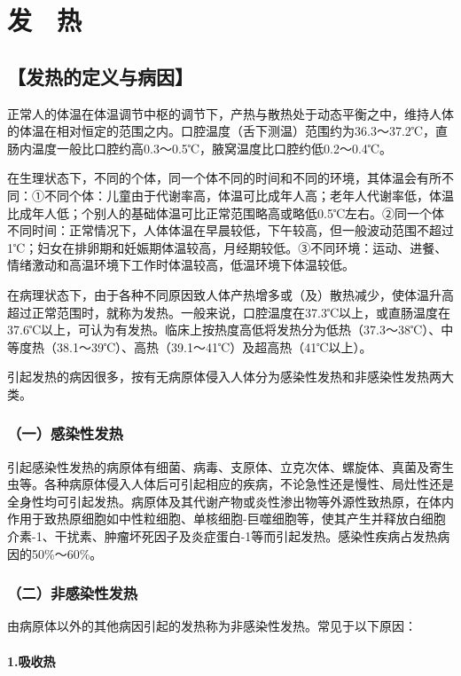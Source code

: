 \chapter{发　热}

\section{【发热的定义与病因】}

正常人的体温在体温调节中枢的调节下，产热与散热处于动态平衡之中，维持人体的体温在相对恒定的范围之内。口腔温度（舌下测温）范围约为36.3～37.2℃，直肠内温度一般比口腔约高0.3～0.5℃，腋窝温度比口腔约低0.2～0.4℃。

在生理状态下，不同的个体，同一个体不同的时间和不同的环境，其体温会有所不同：①不同个体：儿童由于代谢率高，体温可比成年人高；老年人代谢率低，体温比成年人低；个别人的基础体温可比正常范围略高或略低0.5℃左右。②同一个体不同时间：正常情况下，人体体温在早晨较低，下午较高，但一般波动范围不超过1℃；妇女在排卵期和妊娠期体温较高，月经期较低。③不同环境：运动、进餐、情绪激动和高温环境下工作时体温较高，低温环境下体温较低。

在病理状态下，由于各种不同原因致人体产热增多或（及）散热减少，使体温升高超过正常范围时，就称为发热。一般来说，口腔温度在37.3℃以上，或直肠温度在37.6℃以上，可认为有发热。临床上按热度高低将发热分为低热（37.3～38℃）、中等度热（38.1～39℃）、高热（39.1～41℃）及超高热（41℃以上）。

引起发热的病因很多，按有无病原体侵入人体分为感染性发热和非感染性发热两大类。

\subsection{（一）感染性发热}

引起感染性发热的病原体有细菌、病毒、支原体、立克次体、螺旋体、真菌及寄生虫等。各种病原体侵入人体后可引起相应的疾病，不论急性还是慢性、局灶性还是全身性均可引起发热。病原体及其代谢产物或炎性渗出物等外源性致热原，在体内作用于致热原细胞如中性粒细胞、单核细胞-巨噬细胞等，使其产生并释放白细胞介素-1、干扰素、肿瘤坏死因子及炎症蛋白-1等而引起发热。感染性疾病占发热病因的50\%～60\%。

\subsection{（二）非感染性发热}

由病原体以外的其他病因引起的发热称为非感染性发热。常见于以下原因：

\subsubsection{1.吸收热}

